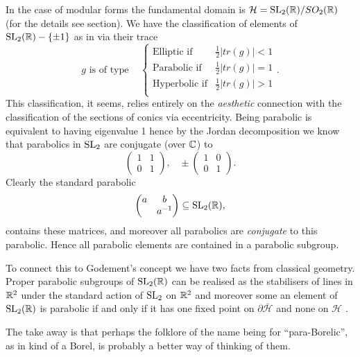\begin{Remark}
    In the case of modular forms the fundamental domain is \(\mathcal{H} = \SL_2(\R)/SO_2(\R)\) (for the details see section\todo{}). We have the classification of elements of  \(\SL_2(\R) -\{\pm 1\}\) as in \cite[3.5]{borelAutomorphicFormsSL21997} via their trace
    \[g\text{ is of type } \;\;\; 
    \begin{cases}
        \text{Elliptic if} & \frac{1}{2}|tr(g)| < 1 \\
        \text{Parabolic if} & \frac{1}{2}|tr(g)| = 1 \\
        \text{Hyperbolic if} & \frac{1}{2}|tr(g)| > 1 \\
    \end{cases}
    .\]
    This classification, it seems, relies entirely on the \textit{aesthetic} connection with the classification of the sections of conics via eccentricity. Being parabolic is equivalent to having eigenvalue 1 hence by the Jordan decomposition we know that parabolics in \(\operatorname{SL}_2\) are conjugate (over \(\C\)) to 
    \[\begin{pmatrix}
        1 & 1\\
        0 & 1
    \end{pmatrix},\;\;\; \pm\begin{pmatrix}
        1 & 0\\
        0 & 1
    \end{pmatrix}.\]
    Clearly the standard parabolic 
    \[\begin{pmatrix}
        a & b \\
         & a\inv
    \end{pmatrix} \subseteq \SL_2(\R),\]
    contains these matrices, and moreover all parabolics are \textit{conjugate} to this parabolic. Hence all parabolic elements are contained in a parabolic subgroup. 

    To connect this to Godement's concept we have two facts from classical geometry. Proper parabolic subgroups of \(\SL_2(\R)\) can be realised as the stabilisers of lines in \(\R^2\) under the standard action of \(\operatorname{SL}_2\) on \(\R^2\) \cite[2.6]{borelAutomorphicFormsSL21997} and moreover some an element of \(\SL_2(\R)\) is parabolic if and only if it has one fixed point on \(\partial\bar{\mathcal{H}}\) and none on \(\mathcal{H}\) \cite[3.5]{borelAutomorphicFormsSL21997}. 

    The take away is that perhaps the folklore of the name being for ``para-Borelic'', as in kind of a Borel, is probably a better way of thinking of them.
\end{Remark}

